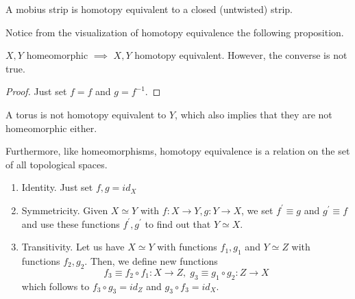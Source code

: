   \begin{example}
  A mobius strip is homotopy equivalent to a closed (untwisted) strip. 
  \end{example}

  Notice from the visualization of homotopy equivalence the following proposition. 

  \begin{proposition}
  $X, Y$ homeomorphic $\implies$ $X, Y$ homotopy equivalent. However, the converse is not true. 
  \end{proposition}
  \begin{proof}
  Just set $f = f$ and $g = f^{-1}$. 
  \end{proof}

  \begin{example}
  A torus is not homotopy equivalent to $Y$, which also implies that they are not homeomorphic either. 
  \begin{center}
  \end{center}
  \end{example}

  Furthermore, like homeomorphisms, homotopy equivalence is a relation on the set of all topological spaces. 
  \begin{enumerate}
      \item Identity. Just set $f, g = id_X$
      \item Symmetricity. Given $X \simeq Y$ with $f: X \longrightarrow Y, g: Y \longrightarrow X$, we set $f^\prime \equiv g$ and $g^\prime \equiv f$ and use these functions $f^\prime, g^\prime$ to find out that $Y \simeq X$. 
      \item Transitivity. Let us have $X \simeq Y$ with functions $f_1, g_1$ and $Y \simeq Z$ with functions $f_2, g_2$. Then, we define new functions 
      \[f_3 \equiv f_2 \circ f_1: X \longrightarrow Z, \; g_3 \equiv g_1 \circ g_2: Z \longrightarrow X\]
      which follows to $f_3 \circ g_3 = id_Z$ and $g_3 \circ f_3 = id_X$. 
  \end{enumerate}

